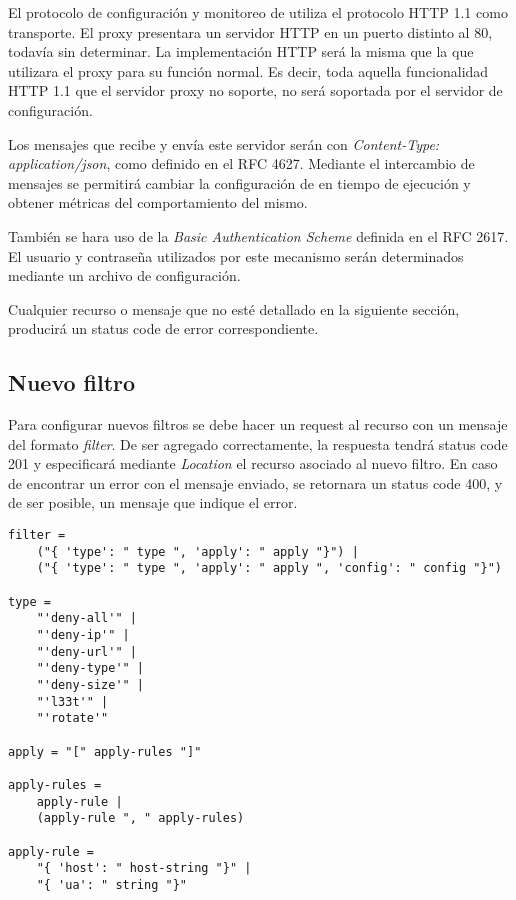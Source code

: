 \documentclass[11pt,a4paper,titlepage]{article}
\begin{document}
El protocolo de configuración y monitoreo de \duta utiliza el protocolo HTTP 1.1 como transporte.
El proxy presentara un servidor HTTP en un puerto distinto al 80, todavía sin determinar.
La implementación HTTP será la misma que la que utilizara el proxy para su función normal.
Es decir, toda aquella funcionalidad HTTP 1.1 que el servidor proxy no soporte, no será soportada por el servidor de configuración.

Los mensajes que recibe y envía este servidor serán con \textit{Content-Type: application/json}, como definido en el RFC 4627.
Mediante el intercambio de mensajes se permitirá cambiar la configuración de \duta en tiempo de ejecución y obtener métricas del comportamiento del mismo.

También se hara uso de la \textit{Basic Authentication Scheme} definida en el RFC 2617.
El usuario y contraseña utilizados por este mecanismo serán determinados mediante un archivo de configuración.

Cualquier recurso o mensaje que no esté detallado en la siguiente sección, producirá un status code de error correspondiente.

\subsection{Nuevo filtro}
\label{sec:new-filter}
Para configurar nuevos filtros se debe hacer un request  al recurso  con un mensaje del formato \textit{filter}.
De ser agregado correctamente, la respuesta tendrá status code 201 y especificará mediante \textit{Location} el recurso asociado al nuevo filtro.
En caso de encontrar un error con el mensaje enviado, se retornara un status code 400, y de ser posible, un mensaje que indique el error.

\begin{verbatim}
filter =
    ("{ 'type': " type ", 'apply': " apply "}") |
    ("{ 'type': " type ", 'apply': " apply ", 'config': " config "}")

type =
    "'deny-all'" |
    "'deny-ip'" |
    "'deny-url'" |
    "'deny-type'" |
    "'deny-size'" |
    "'l33t'" |
    "'rotate'"

apply = "[" apply-rules "]"

apply-rules =
    apply-rule |
    (apply-rule ", " apply-rules)

apply-rule =
    "{ 'host': " host-string "}" |
    "{ 'ua': " string "}"

\end{verbatim}
\end{document}
